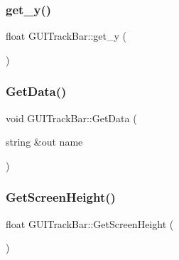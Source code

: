 \hypertarget{class_g_u_i_track_bar_afa2f929dc0b5a4a29703f722b5d43f23}{}\label{class_g_u_i_track_bar_afa2f929dc0b5a4a29703f722b5d43f23} 
\subsubsection{\texorpdfstring{get\+\_\+y()}{get\_y()}}
{\footnotesize\ttfamily float G\+U\+I\+Track\+Bar\+::get\+\_\+y (\begin{DoxyParamCaption}{ }\end{DoxyParamCaption})}

\hypertarget{class_g_u_i_track_bar_a4a023c9519cd7255e7d4aea1dcc90e6c}{}\label{class_g_u_i_track_bar_a4a023c9519cd7255e7d4aea1dcc90e6c} 
\subsubsection{\texorpdfstring{Get\+Data()}{GetData()}}
{\footnotesize\ttfamily void G\+U\+I\+Track\+Bar\+::\+Get\+Data (\begin{DoxyParamCaption}\item[{string \&out}]{name }\end{DoxyParamCaption})}

\hypertarget{class_g_u_i_track_bar_ac2ef1d8f2644d2e4d2c0ffb7eb595a01}{}\label{class_g_u_i_track_bar_ac2ef1d8f2644d2e4d2c0ffb7eb595a01} 
\subsubsection{\texorpdfstring{Get\+Screen\+Height()}{GetScreenHeight()}}
{\footnotesize\ttfamily float G\+U\+I\+Track\+Bar\+::\+Get\+Screen\+Height (\begin{DoxyParamCaption}{ }\end{DoxyParamCaption})}

\hypertarget{class_g_u_i_track_bar_a7270bf50d1cbcaf75f7b421d4761362c}{}\label{class_g_u_i_track_bar_a7270bf50d1cbcaf75f7b421d4761362c} 
